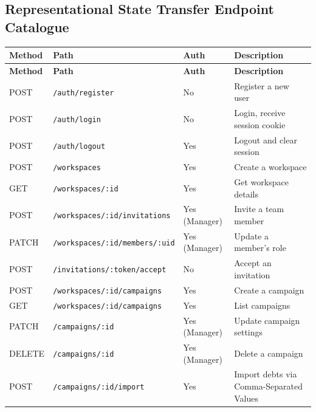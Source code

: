 \documentclass[12pt,a4paper]{report}
\newcommand{\apitablecols}{|p{1.2cm}|p{4.95cm}|p{2.25cm}|p{5.05cm}|}
\begin{document}
\subsection{Representational State Transfer Endpoint Catalogue}

{\footnotesize
\setlength{\tabcolsep}{4pt}%
\begin{longtable}{\apitablecols}
  \hline
  \rowcolor{accentblue!10}
  \textbf{Method} & \textbf{Path} & \textbf{Auth} & \textbf{Description} \\
  \hline
  \endfirsthead
  \hline
  \rowcolor{accentblue!10}
  \textbf{Method} & \textbf{Path} & \textbf{Auth} & \textbf{Description} \\
  \hline
  \endhead
  POST  & \texttt{/auth/register}                    & No             & Register a new user \\
  \hline
  POST  & \texttt{/auth/login}                       & No             & Login, receive session cookie \\
  \hline
  POST  & \texttt{/auth/logout}                      & Yes            & Logout and clear session \\
  \hline
  POST  & \texttt{/workspaces}                       & Yes            & Create a workspace \\
  \hline
  GET   & \texttt{/workspaces/:id}                   & Yes            & Get workspace details \\
  \hline
  POST  & \texttt{/workspaces/:id/invitations}       & Yes (Manager)  & Invite a team member \\
  \hline
  PATCH & \texttt{/workspaces/:id/members/:uid}      & Yes (Manager)  & Update a member's role \\
  \hline
  POST  & \texttt{/invitations/:token/accept}        & No             & Accept an invitation \\
  \hline
  POST  & \texttt{/workspaces/:id/campaigns}         & Yes            & Create a campaign \\
  \hline
  GET   & \texttt{/workspaces/:id/campaigns}         & Yes            & List campaigns \\
  \hline
  PATCH & \texttt{/campaigns/:id}                    & Yes (Manager)  & Update campaign settings \\
  \hline
  DELETE & \texttt{/campaigns/:id}                   & Yes (Manager)  & Delete a campaign \\
  \hline
  POST  & \texttt{/campaigns/:id/import}             & Yes            & Import debts via Comma-Separated Values \\

\end{longtable}}
\end{document}
